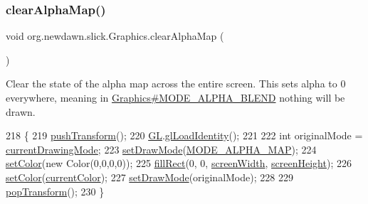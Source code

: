 \subsubsection{\texorpdfstring{clear\+Alpha\+Map()}{clearAlphaMap()}}
{\footnotesize\ttfamily void org.\+newdawn.\+slick.\+Graphics.\+clear\+Alpha\+Map (\begin{DoxyParamCaption}{ }\end{DoxyParamCaption})\hspace{0.3cm}{\ttfamily [inline]}}

Clear the state of the alpha map across the entire screen. This sets alpha to 0 everywhere, meaning in \mbox{\hyperlink{classorg_1_1newdawn_1_1slick_1_1_graphics_a02782fadf540222d2928c940ea4f70a4}{Graphics\#\+M\+O\+D\+E\+\_\+\+A\+L\+P\+H\+A\+\_\+\+B\+L\+E\+ND}} nothing will be drawn. 
\begin{DoxyCode}
218                                 \{
219         \mbox{\hyperlink{classorg_1_1newdawn_1_1slick_1_1_graphics_aabec073ba0ee1e86cccddc175f2ebbb5}{pushTransform}}();
220         \mbox{\hyperlink{classorg_1_1newdawn_1_1slick_1_1_graphics_a39ca68db81b225982a4421c4a6835eed}{GL}}.\mbox{\hyperlink{interfaceorg_1_1newdawn_1_1slick_1_1opengl_1_1renderer_1_1_s_g_l_a55d2290e0e4840f3aff84bf698d0ea60}{glLoadIdentity}}();
221         
222         \textcolor{keywordtype}{int} originalMode = \mbox{\hyperlink{classorg_1_1newdawn_1_1slick_1_1_graphics_ac16a9a1c8d01b16444ba0851570d1588}{currentDrawingMode}};
223         \mbox{\hyperlink{classorg_1_1newdawn_1_1slick_1_1_graphics_a468e2501a15587e800ece5535eb72069}{setDrawMode}}(\mbox{\hyperlink{classorg_1_1newdawn_1_1slick_1_1_graphics_a5b49f0f7eba96853f6a1e337ff44fb0e}{MODE\_ALPHA\_MAP}});
224         \mbox{\hyperlink{classorg_1_1newdawn_1_1slick_1_1_graphics_a725360b8b6c1b50306fe2e8ff4ed44fd}{setColor}}(\textcolor{keyword}{new} Color(0,0,0,0));
225         \mbox{\hyperlink{classorg_1_1newdawn_1_1slick_1_1_graphics_abf60283053540c66f00a722ebacb59a4}{fillRect}}(0, 0, \mbox{\hyperlink{classorg_1_1newdawn_1_1slick_1_1_graphics_adbb4b10050a8bcf8e496130509784f71}{screenWidth}}, \mbox{\hyperlink{classorg_1_1newdawn_1_1slick_1_1_graphics_a24cd14275ad2dcd82fcd843ceab6a80b}{screenHeight}});
226         \mbox{\hyperlink{classorg_1_1newdawn_1_1slick_1_1_graphics_a725360b8b6c1b50306fe2e8ff4ed44fd}{setColor}}(\mbox{\hyperlink{classorg_1_1newdawn_1_1slick_1_1_graphics_add4b542e574390a735aad66468135d5a}{currentColor}});
227         \mbox{\hyperlink{classorg_1_1newdawn_1_1slick_1_1_graphics_a468e2501a15587e800ece5535eb72069}{setDrawMode}}(originalMode);
228         
229         \mbox{\hyperlink{classorg_1_1newdawn_1_1slick_1_1_graphics_a12d08ed83f89d831b864b10ea5769bbb}{popTransform}}();
230     \}
\end{DoxyCode}
\mbox{\label{classorg_1_1newdawn_1_1slick_1_1_graphics_a9e08c31449d2021836928b18daee5083}} 
